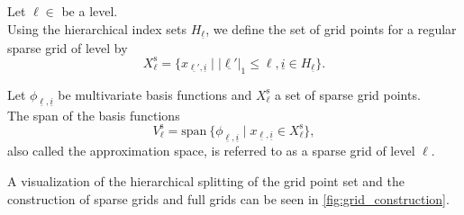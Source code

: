 \documentclass[
  a4paper,  %
  twoside,  %
  bibliography=totoc,
  headsepline,
  cleardoublepage=empty,
  parskip=half,
  draft=false
]{scrbook}
\begin{document}
\begin{definition}
Let $\ell \in $ be a level.\\
Using the hierarchical index sets $H_{\underline{\ell}}$, we define the set of grid points for a regular sparse grid of level by
\begin{equation}
X^{\text{s}}_{\ell}=\{x_{\underline{\ell'},\underline{i}} \mid |\underline{\ell'}|_1 \leq \ell, \underline{i} \in H_{\underline{\ell}}\}.
\end{equation}
\end{definition}

\begin{definition}
Let $\phi_{\underline{\ell},\underline{i}}$ be multivariate basis functions and $X^{\text{s}}_{\ell}$ a set of sparse grid points.\\
The span of the basis functions
\begin{equation}
V^{\text{s}}_{\ell}=\text{span}~ \{\phi_{\underline{\ell},\underline{i}} \mid x_{\underline{\ell},\underline{i}} \in X^{\text{s}}_{\ell}\},
\label{eq:sparse_grid}
\end{equation}
also called the approximation space, is referred to as a sparse grid of level $\ell$.
\end{definition}

A visualization of the hierarchical splitting of the grid point set and the construction of sparse grids and full grids can be seen in \cref{fig:grid_construction}.
\end{document}

